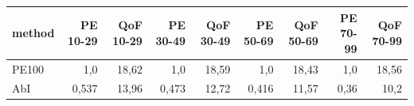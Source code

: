 \begin{tabular}{lrrrrrrrr}
\toprule
method & PE 10-29 & QoF 10-29 & PE 30-49 & QoF 30-49 & PE 50-69 & QoF 50-69 & PE 70-99 & QoF 70-99 \\
\midrule
PE100 & 1{,}0 & 18{,}62 & 1{,}0 & 18{,}59 & 1{,}0 & 18{,}43 & 1{,}0 & 18{,}56 \\
AbI & 0{,}537 & 13{,}96 & 0{,}473 & 12{,}72 & 0{,}416 & 11{,}57 & 0{,}36 & 10{,}2 \\
\bottomrule
\end{tabular}

